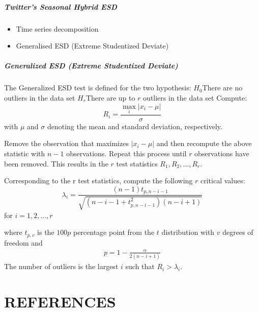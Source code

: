 \documentclass[aspectratio=169]{beamer}
\begin{document}
\begin{frame}
\frametitle{Twitter's Seasonal Hybrid ESD}
\begin{itemize}
    \item Time series decomposition
    \item Generalised ESD (Extreme Studentized Deviate)
\end{itemize}

\end{frame}


\begin{frame}[allowframebreaks]
\frametitle{Generalized ESD (Extreme Studentized Deviate)}
The Generalized ESD\cite{ref:rosner} test is defined for the two hypothesis:\newline
$H_0$\hspace{24pt}There are no outliers in the data set\newline
$H_r$\hspace{24pt}There are up to $r$ outliers in the data set\newline
Compute:\newline
\begin{equation}
R_i=\frac{\max_i | x_i - \mu | }{\sigma}
\end{equation}
with $\mu$ and $\sigma$ denoting the mean and standard deviation, respectively.

Remove the observation that maximizes $| x_i - \mu |$ and then recompute the above statistic with $n - 1$ observations. Repeat this process until $r$ observations have been removed. This results in the $r$ test statistics $R_1, R_2, \ldots, R_r$.

Corresponding to the r test statistics, compute the following $r$ critical values:\newline
\begin{equation}
\lambda_i=\frac{ (n-1)t_{p,n-i-1}}{\sqrt{(n-i-1 + t^2_{p, n-i-1})(n-i+1)}}  
\end{equation}
for $i=1,2,\ldots,r$

where $t_{p,v}$ is the $100p$ percentage point from the $t$ distribution with $v$ degrees of freedom and
\begin{align*}
p = 1 - \frac{\alpha}{2(n-i+1)}
\end{align*}
The number of outliers is the largest $i$ such that $R_i > λ_i$.
\end{frame}
\AtBeginPart{}
\part{R{\small EFERENCES}}

\begin{multicols*}{2}[\frametitle{} ]
	\printbibliography
\end{multicols*}

%	
%	
\end{document}
